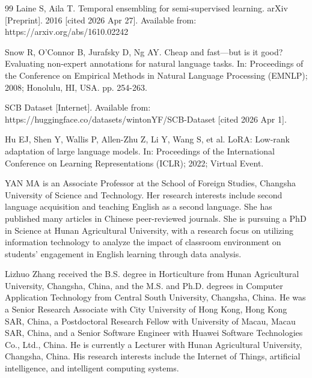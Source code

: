\documentclass{ieeeaccess}
\begin{document}
\begin{thebibliography}{99}
Laine S, Aila T.
Temporal ensembling for semi-supervised learning.
arXiv [Preprint]. 2016 [cited 2026 Apr 27]. Available from:
https://arxiv.org/abs/1610.02242

Snow R, O'Connor B, Jurafsky D, Ng AY.
Cheap and fast---but is it good? Evaluating non-expert annotations
for natural language tasks.
In: Proceedings of the Conference on Empirical Methods in Natural
Language Processing (EMNLP); 2008; Honolulu, HI, USA. pp. 254-263.

SCB Dataset [Internet]. Available from:
https://huggingface.co/datasets/wintonYF/SCB-Dataset [cited 2026 Apr 1].

Hu EJ, Shen Y, Wallis P, Allen-Zhu Z, Li Y, Wang S, et al.
LoRA: Low-rank adaptation of large language models.
In: Proceedings of the International Conference on Learning
Representations (ICLR); 2022; Virtual Event.

\end{thebibliography}

\EOD

\begin{IEEEbiographynophoto}{YAN MA}
is an Associate Professor at the School of Foreign Studies, Changsha
University of Science and Technology. Her research interests include
second language acquisition and teaching English as a second language.
She has published many articles in Chinese peer-reviewed journals. She
is pursuing a PhD in Science at Hunan Agricultural University, with a
research focus on utilizing information technology to analyze the
impact of classroom environment on students' engagement in English
learning through data analysis.
\end{IEEEbiographynophoto}

\begin{IEEEbiographynophoto}{Lizhuo Zhang}
received the B.S. degree in Horticulture from Hunan Agricultural
University, Changsha, China, and the M.S. and Ph.D. degrees in
Computer Application Technology from Central South University,
Changsha, China. He was a Senior Research Associate with City
University of Hong Kong, Hong Kong SAR, China, a Postdoctoral
Research Fellow with University of Macau, Macau SAR, China, and a
Senior Software Engineer with Huawei Software Technologies Co., Ltd.,
China. He is currently a Lecturer with Hunan Agricultural University,
Changsha, China. His research interests include the Internet of
Things, artificial intelligence, and intelligent computing systems.
\end{IEEEbiographynophoto}
\end{document}
